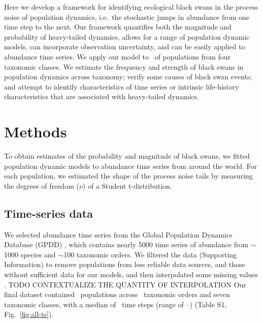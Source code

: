 Here we develop a framework for identifying ecological black swans in the process noise of population dynamics, i.e.\ the stochastic jumps in abundance from one time step to the next. Our framework quantifies both the magnitude and probability of heavy-tailed dynamics, allows for a range of population dynamic models, can incorporate observation uncertainty, and can be easily applied to abundance time series. We apply our model to \NPops\ of populations from four taxonomic classes. We estimate the frequency and strength of black swans in population dynamics across taxonomy; verify some causes of black swan events; and attempt to identify characteristics of time series or intrinsic life-history characteristics that are associated with heavy-tailed dynamics.

\section{Methods}

To obtain estimates of the probability and magnitude of black swans, we fitted population dynamic models to abundance time series from around the world. For each population, we estimated the shape of the process noise tails by measuring the degrees of freedom ($\nu$) of a Student t-distribution.

\subsection{Time-series data}

We selected abundance time series from the Global Population Dynamics Database (GPDD) \citep{gpdd2010}, which contains nearly 5000 time series of abundance from $\sim$1000 species and $\sim$100 taxonomic orders. We filtered the data (Supporting Information) to remove populations from less reliable data sources, and those without sufficient data for our models, and then interpolated some missing values \citep[\textit{sensu}][]{brook2006a}. TODO CONTEXTUALIZE THE QUANTITY OF INTERPOLATION Our final dataset contained \NPops~populations across \NOrders~taxonomic orders and seven taxonomic classes, with a median of \medianTimeSteps~time steps (range of \minTimeSteps--\maxTimeSteps) (Table S1, Fig.~\ref{fig:all-ts}).

